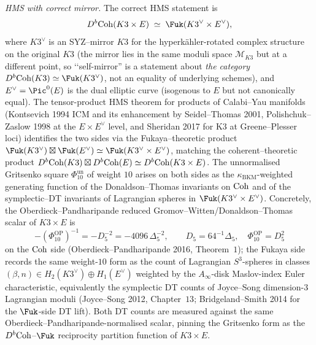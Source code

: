 \begin{remark}
\emph{HMS with correct mirror.} The correct HMS statement is
\[
 D^b\Coh(K3\times E) \;\simeq\; \Fuk(K3^\vee\times E^\vee),
\]
where $K3^\vee$ is an SYZ--mirror $K3$ for the hyperk\"ahler-rotated
complex structure on the original $K3$ (the mirror lies in the same
moduli space $\mathcal M_{K3}$ but at a different point, so
\lq\lq self-mirror'' is a statement about \emph{the category}
$D^b\Coh(K3)\simeq\Fuk(K3^\vee)$, not an equality of underlying
schemes), and $E^\vee = \Pic^0(E)$ is the dual elliptic curve
(isogenous to $E$ but not canonically equal). The tensor-product HMS
theorem for products of Calabi--Yau manifolds (Kontsevich 1994 ICM
and its enhancement by Seidel--Thomas 2001, Polishchuk--Zaslow 1998
at the $E\times E^\vee$ level, and Sheridan 2017 for K3 at Greene--Plesser
loci) identifies the two sides via the Fukaya--theoretic product
$\Fuk(K3^\vee)\boxtimes\Fuk(E^\vee)\simeq\Fuk(K3^\vee\times E^\vee)$,
matching the coherent--theoretic product
$D^b\mathrm{Coh}(K3)\boxtimes D^b\mathrm{Coh}(E)\simeq D^b\mathrm{Coh}(K3\times E)$.
The unnormalised Gritsenko square \(\Phi_{10}^{\mathrm{un}}\) of weight $10$ arises on both sides as the
$\kappa_{\mathrm{BKM}}$-weighted generating function of the
Donaldson--Thomas invariants on $\mathrm{Coh}$ and of the symplectic--DT
invariants of Lagrangian spheres in
$\Fuk(K3^\vee\times E^\vee)$. Concretely,
the Oberdieck--Pandharipande reduced Gromov--Witten/Donaldson--Thomas
scalar of $K3\times E$ is
\[
-(\Phi_{10}^{\mathrm{OP}})^{-1}=-D_5^{-2}=-4096\,\Delta_5^{-2},
\qquad
D_5=64^{-1}\Delta_5,\quad
\Phi_{10}^{\mathrm{OP}}=D_5^2
\]
on the $\mathrm{Coh}$ side
(Oberdieck--Pandharipande 2016, Theorem~$1$); the Fukaya side records
the same weight-$10$ form as the count of Lagrangian
$S^3$-spheres in classes $(\beta,n)\in H_2(K3^\vee)\oplus H_1(E^\vee)$
weighted by the $A_\infty$-disk Maslov-index Euler characteristic,
equivalently the symplectic DT counts of Joyce--Song
dimension-$3$ Lagrangian moduli
(Joyce--Song 2012, Chapter~$13$; Bridgeland--Smith 2014 for the
$\Fuk$-side DT lift). Both DT counts are measured against the same
Oberdieck--Pandharipande-normalised scalar, pinning the Gritsenko form as the
$D^b\mathrm{Coh}$--$\Fuk$ reciprocity partition function of $K3\times E$.


\end{remark}
